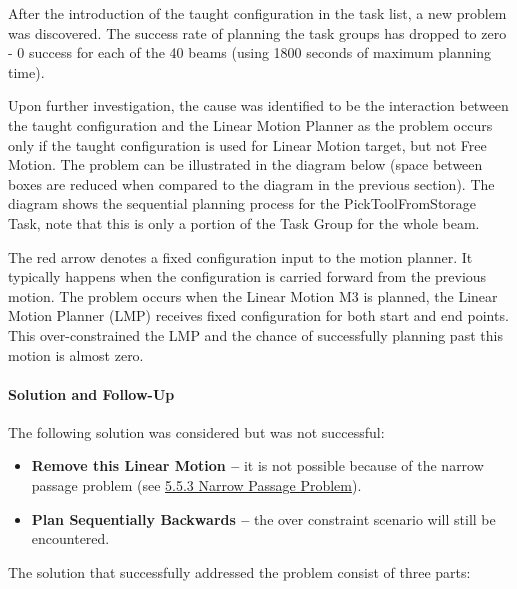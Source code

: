 After the introduction of the taught configuration in the task list, a new problem was discovered. The success rate of planning the task groups has dropped to zero - 0 success for each of the 40 beams (using 1800 seconds of maximum planning time).

Upon further investigation, the cause was identified to be the interaction between the taught configuration and the Linear Motion Planner as the problem occurs only if the taught configuration is used for Linear Motion target, but not Free Motion. The problem can be illustrated in the diagram below (space between boxes are reduced when compared to the diagram in the previous section). The diagram shows the sequential planning process for the PickToolFromStorage Task, note that this is only a portion of the Task Group for the whole beam. 

The red arrow denotes a fixed configuration input to the motion planner. It typically happens when the configuration is carried forward from the previous motion. The problem occurs when the Linear Motion M3 is planned, the Linear Motion Planner (LMP) receives fixed configuration for both start and end points. This over-constrained the LMP and the chance of successfully planning past this motion is almost zero.




\paragraph{Solution and Follow-Up}

The following solution was considered but was not successful:

\begin{itemize}
	\item \textbf{Remove this Linear Motion --} it is not possible because of the narrow passage problem (see \ul{5.5.3 Narrow Passage Problem}). 

	\item \textbf{Plan Sequentially Backwards --} the over constraint scenario will still be encountered.

\end{itemize}
The solution that successfully addressed the problem consist of three parts:


